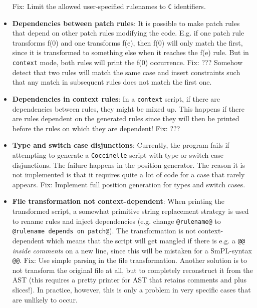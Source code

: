 \begin{itemize}
Fix: Limit the allowed user-specified rulenames to \texttt{C} identifiers.
\item \textbf{Dependencies between patch rules}: It is possible to make patch rules that depend on other patch rules modifying the code. E.g. if one patch rule transforms f(0) and one transforms f(e), then f(0) will only match the first, since it is transformed to something else when it reaches the f(e) rule. But in \texttt{context} mode, both rules will print the f(0) occurrence.\newline
Fix: ??? Somehow detect that two rules will match the same case and insert constraints such that any match in subsequent rules does not match the first one.
\item \textbf{Dependencies in context rules}: In a \texttt{context} script, if there are dependencies between rules, they might be mixed up. This happens if there are rules dependent on the generated rules since they will then be printed before the rules on which they are dependent!\newline
Fix: ???
\item \textbf{Type and switch case disjunctions}: Currently, the program fails if attempting to generate a \texttt{Coccinelle} script with type or switch case disjunctions. The failure happens in the position generator. The reason it is not implemented is that it requires quite a lot of code for a case that rarely appears.\newline
Fix: Implement full position generation for types and switch cases.
\item \textbf{File transformation not context-dependent}: When printing the transformed script, a somewhat primitive string replacement strategy is used to rename rules and inject dependencies (e.g. change \texttt{@rulename@} to \texttt{@rulename depends on patch@}). The transformation is not context-dependent which means that the script will get mangled if there is e.g. a \texttt{@@} \textit{inside comments} on a new line, since this will be mistaken for a SmPL-syntax \texttt{@@}.\newline
Fix: Use simple parsing in the file transformation. Another solution is to not transform the original file at all, but to completely reconstruct it from the AST (this requires a pretty printer for AST that retains comments and plus slices!). In practice, however, this is only a problem in very specific cases that are unlikely to occur.
\end{itemize}
